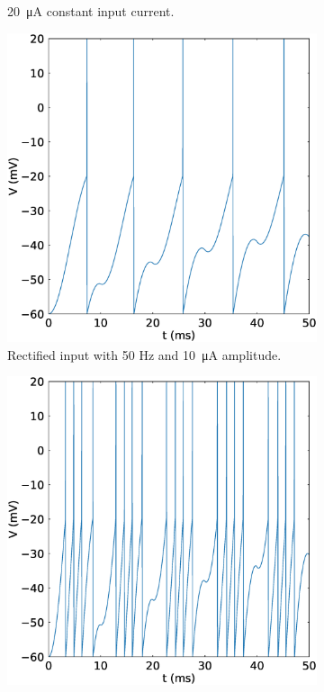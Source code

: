 \documentclass{scrartcl}			%
\begin{document}
\begin{figure}[h]
\begin{subfigure}[b]{0.5\linewidth}
    \caption{\SI{20}{\micro\ampere} constant input current.} 
    \label{fig:20const} 
    \quad
  \end{subfigure} 
  \begin{subfigure}[b]{0.5\linewidth}
    \centering
    \includegraphics[width=\linewidth]{imgs/10muA_rect_curr.eps} 
    \caption{Rectified input with 50 Hz and \SI{10}{\micro\ampere} amplitude.} 
    \label{fig:10rect} 
  \end{subfigure}%
  \begin{subfigure}[b]{0.5\linewidth}
    \centering
    \includegraphics[width=\linewidth]{imgs/30muA_rect_curr.eps} 

\end{subfigure}
\end{figure}
\end{document}
